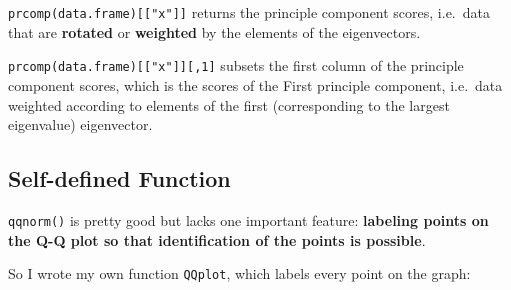 \documentclass[]{book}
\theoremstyle{definition}
\theoremstyle{definition}
\theoremstyle{definition}
\theoremstyle{remark}
\begin{document}
\texttt{prcomp(data.frame){[}{[}"x"{]}{]}} returns the principle
component scores, i.e.~data that are \textbf{rotated} or
\textbf{weighted} by the elements of the eigenvectors.

\texttt{prcomp(data.frame){[}{[}"x"{]}{]}{[},1{]}} subsets the first
column of the principle component scores, which is the scores of the
First principle component, i.e.~data weighted according to elements of
the first (corresponding to the largest eigenvalue) eigenvector.

\subsection{Self-defined Function}\label{self-defined-function}

\texttt{qqnorm()} is pretty good but lacks one important feature:
\textbf{labeling points on the Q-Q plot so that identification of the
points is possible}.

So I wrote my own function \texttt{QQplot}, which labels every point on
the graph:
\end{document}
